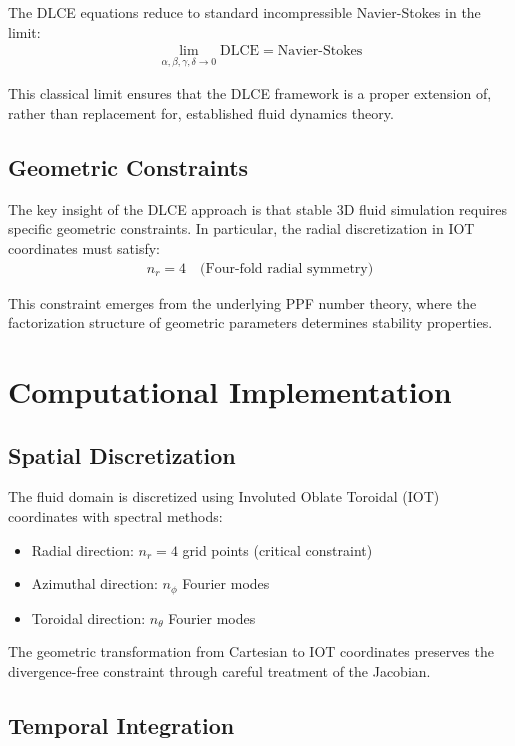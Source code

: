 \documentclass[conference]{IEEEtran}
\begin{document}
The DLCE equations reduce to standard incompressible Navier-Stokes in the limit:
\begin{align}
\lim_{\alpha,\beta,\gamma,\delta \to 0} \text{DLCE} = \text{Navier-Stokes}
\end{align}

This classical limit ensures that the DLCE framework is a proper extension of, rather than replacement for, established fluid dynamics theory.

\subsection{Geometric Constraints}

The key insight of the DLCE approach is that stable 3D fluid simulation requires specific geometric constraints. In particular, the radial discretization in IOT coordinates must satisfy:
\begin{align}
n_r = 4 \quad \text{(Four-fold radial symmetry)}
\end{align}

This constraint emerges from the underlying PPF number theory, where the factorization structure of geometric parameters determines stability properties.

\section{Computational Implementation}

\subsection{Spatial Discretization}

The fluid domain is discretized using Involuted Oblate Toroidal (IOT) coordinates with spectral methods:
\begin{itemize}
\item Radial direction: $n_r = 4$ grid points (critical constraint)
\item Azimuthal direction: $n_\phi$ Fourier modes  
\item Toroidal direction: $n_\theta$ Fourier modes
\end{itemize}

The geometric transformation from Cartesian to IOT coordinates preserves the divergence-free constraint through careful treatment of the Jacobian.

\subsection{Temporal Integration}
\end{document}
